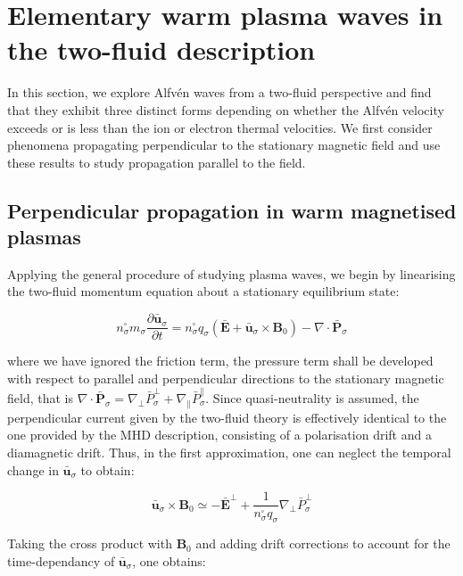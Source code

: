 \section{Elementary warm plasma waves in the two-fluid description}

In this section, we explore Alfvén waves from a two-fluid perspective and find that they exhibit three distinct forms depending on whether the Alfvén velocity exceeds or is less than the ion or electron thermal velocities. We first consider phenomena propagating perpendicular to the stationary magnetic field and use these results to study propagation parallel to the field. 

\subsection{Perpendicular propagation in warm magnetised plasmas}

Applying the general procedure of studying plasma waves, we begin by linearising the two-fluid momentum equation about a stationary equilibrium state:

\begin{equation}
    n_\sigma^\square m_\sigma\frac{\partial\bar{\mathbf{u}}_\sigma}{\partial t}=n_\sigma^\square q_\sigma(\bar{\mathbf{E}}+\bar{\mathbf{u}}_\sigma\times\mathbf{B}_0)-\nabla\cdot\bar{\mathbf{P}}_\sigma
\end{equation}

where we have ignored the friction term, the pressure term shall be developed with respect to parallel and perpendicular directions to the stationary magnetic field, that is $\nabla\cdot\bar{\mathbf{P}}_\sigma=\nabla_\perp\bar{P}_\sigma^\perp+\nabla_\parallel\bar{P}_\sigma^\parallel$. Since quasi-neutrality is assumed, the perpendicular current given by the two-fluid theory is effectively identical to the one provided by the MHD description, consisting of a polarisation drift and a diamagnetic drift. Thus, in the first approximation, one can neglect the temporal change in $\bar{\mathbf{u}}_\sigma$ to obtain:

\begin{equation}
    \bar{\mathbf{u}}_\sigma\times\mathbf{B}_0\simeq-\bar{\mathbf{E}}^\perp+\frac{1}{n_\sigma^\square q_\sigma}\nabla_\perp\bar{P}_\sigma^\perp
\end{equation}

Taking the cross product with $\mathbf{B}_0$ and adding drift corrections to account for the time-dependancy of $\bar{\mathbf{u}}_\sigma$, one obtains:

